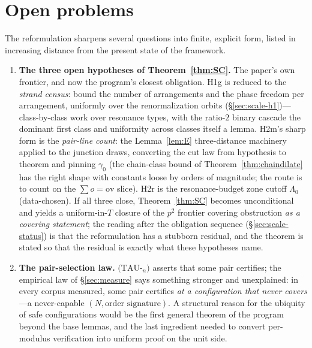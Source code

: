 \documentclass[11pt,a4paper]{article}
\numberwithin{equation}{section}
\theoremstyle{plain}
\theoremstyle{definition}
\theoremstyle{remark}
\begin{document}
\section{Open problems}\label{sec:open}

The reformulation sharpens several questions into finite, explicit form,
listed in increasing distance from the present
state of the framework.

\begin{enumerate}[leftmargin=1.7em,itemsep=4pt]

\item \textbf{The three open hypotheses of Theorem~\ref{thm:SC}.} The paper's
  own frontier, and now the program's closest obligation. H1g is reduced
  to the \emph{strand census}: bound the number of arrangements and the
  phase freedom per arrangement, uniformly over the renormalization
  orbits (\S\ref{sec:scale-h1})---class-by-class work over resonance
  types, with the ratio-$2$ binary cascade the dominant first class and
  uniformity across classes itself a lemma. H2m's sharp form is the
  \emph{pair-line count}: the Lemma~\ref{lem:E} three-distance
  machinery applied to the junction draws, converting the cut law from
  hypothesis to theorem and pinning $\gamma_0$ (the chain-class bound of
  Theorem~\ref{thm:chaindilate} has the right shape with constants loose
  by orders of magnitude; the route is to count on the
  $\sum o=\mathrm{ov}$ slice). H2r is the resonance-budget zone cutoff
  $\Lambda_0$ (data-chosen). If all three close, Theorem~\ref{thm:SC}
  becomes unconditional and yields a uniform-in-$T$ closure of the $p^2$
  frontier covering obstruction \emph{as a covering statement}; the
  reading after the obligation sequence
  (\S\ref{sec:scale-status}) is that the reformulation has a stubborn
  residual, and the theorem is stated so that the residual is exactly
  what these hypotheses name.

\item \textbf{The pair-selection law.} $(\mathrm{TAU}$-$_n)$ asserts that
  some pair certifies; the empirical law of \S\ref{sec:measure} says
  something stronger and unexplained: in every corpus measured, some pair
  certifies \emph{at a configuration that never covers}---a never-capable
  $(N,\text{order signature})$. A structural reason for the ubiquity of
  safe configurations would be the first general theorem of the program
  beyond the base lemmas, and the last ingredient needed to convert
  per-modulus verification into uniform proof on the unit side.


\end{enumerate}
\end{document}
